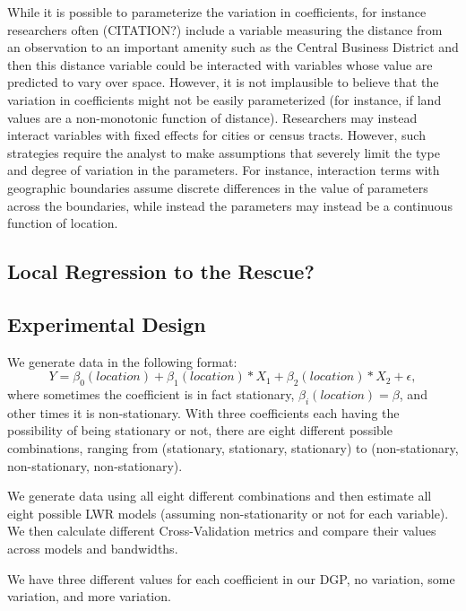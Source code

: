 \documentclass{article}\usepackage[]{graphicx}\usepackage[]{color}
\begin{document}
While it is possible to parameterize the variation in coefficients, for instance researchers often (CITATION?) include a variable measuring the distance from an observation to an important amenity such as the Central Business District and then this distance variable could be interacted with variables whose value are predicted to vary over space. However, it is not implausible to believe that the variation in coefficients might not be easily parameterized (for instance, if land values are a non-monotonic function of distance). Researchers may instead interact variables with fixed effects for cities or census tracts. However, such strategies require the analyst to make assumptions that severely limit the type and degree of variation in the parameters. For instance, interaction terms with geographic boundaries assume discrete differences in the value of parameters across the boundaries, while instead the parameters may instead be a continuous function of location.

\subsection{Local Regression to the Rescue?}


\subsection{Experimental Design}

We generate data in the following format:
\begin{equation}
Y = \beta _0(location) + \beta _1(location) *X_1 + \beta _2(location) * X_2 + \epsilon ,
\end{equation}
where sometimes the coefficient is in fact stationary, $\beta _i(location) = \beta$, and other times it is non-stationary. With three coefficients each having the possibility of being stationary or not, there are eight different possible combinations, ranging from (stationary, stationary, stationary) to (non-stationary, non-stationary, non-stationary).

We generate data using all eight different combinations and then estimate all eight possible LWR models (assuming non-stationarity or not for each variable). We then calculate different Cross-Validation metrics and compare their values across models and bandwidths. 

We have three different values for each coefficient in our DGP, no variation, some variation, and more variation.
\end{document}

